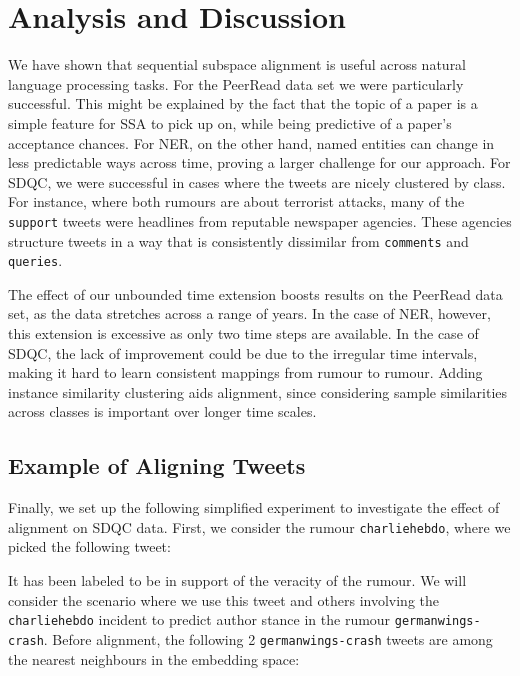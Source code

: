 \documentclass[letterpaper]{article} %
\begin{document}
\section{Analysis and Discussion} \label{sec:discussion}
We have shown that sequential subspace alignment is useful across natural language processing tasks. %
For the PeerRead data set we were particularly successful. This might be explained by the fact that the topic of a paper is a simple feature for SSA to pick up on, while being predictive of a paper's acceptance chances.
For NER, on the other hand, named entities can change in less predictable ways across time, proving a larger challenge for our approach.
For SDQC, we were successful in cases where the tweets are nicely clustered by class. For instance, where both rumours are about terrorist attacks, many of the \texttt{support} tweets were headlines from reputable newspaper agencies. These agencies structure tweets in a way that is consistently dissimilar from \texttt{comments} and \texttt{queries}.

The effect of our unbounded time extension boosts results on the PeerRead data set, as the data stretches across a range of years.
In the case of NER, however, this extension is excessive as only two time steps are available.
In the case of SDQC, the lack of improvement could be due to the irregular time intervals, making it hard to learn consistent mappings from rumour to rumour.
Adding instance similarity clustering aids alignment, since considering sample similarities across classes is important over longer time scales.

\subsection{Example of Aligning Tweets}
Finally, we set up the following simplified experiment to investigate the effect of alignment on SDQC data. First, we consider the rumour \texttt{charliehebdo}, where we picked the following tweet:

\vspace{5px}
\noindent {}
\vspace{5px}

\noindent It has been labeled to be in support of the veracity of the rumour. We will consider the scenario where we use this tweet and others involving the \texttt{charliehebdo} incident to predict author stance in the rumour \texttt{germanwings-crash}. Before alignment, the following 2 \texttt{germanwings-crash} tweets are among the nearest neighbours in the embedding space:
\end{document}
